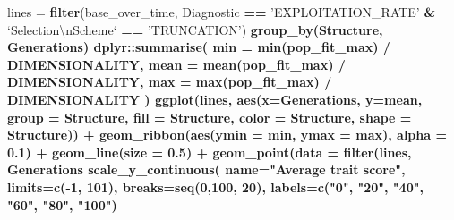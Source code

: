 \documentclass[]{book}
\newenvironment{Shaded}{\begin{snugshade}}{\end{snugshade}}
\newcommand{\CharTok}[1]{\textcolor[rgb]{0.31,0.60,0.02}{#1}}
\newcommand{\DataTypeTok}[1]{\textcolor[rgb]{0.13,0.29,0.53}{#1}}
\newcommand{\DecValTok}[1]{\textcolor[rgb]{0.00,0.00,0.81}{#1}}
\newcommand{\FloatTok}[1]{\textcolor[rgb]{0.00,0.00,0.81}{#1}}
\newcommand{\KeywordTok}[1]{\textcolor[rgb]{0.13,0.29,0.53}{\textbf{#1}}}
\newcommand{\NormalTok}[1]{#1}
\newcommand{\OperatorTok}[1]{\textcolor[rgb]{0.81,0.36,0.00}{\textbf{#1}}}
\newcommand{\StringTok}[1]{\textcolor[rgb]{0.31,0.60,0.02}{#1}}
\begin{document}
\begin{Shaded}
\begin{Highlighting}[]
\NormalTok{lines =}\StringTok{ }\KeywordTok{filter}\NormalTok{(base_over_time, Diagnostic }\OperatorTok{==}\StringTok{ 'EXPLOITATION_RATE'} \OperatorTok{&}\StringTok{ `}\DataTypeTok{Selection}\CharTok{\textbackslash{}n}\DataTypeTok{Scheme}\StringTok{`} \OperatorTok{==}\StringTok{ 'TRUNCATION'}\NormalTok{) }\OperatorTok{%>%}
\StringTok{  }\KeywordTok{group_by}\NormalTok{(Structure, Generations) }\OperatorTok{%>%}
\StringTok{  }\NormalTok{dplyr}\OperatorTok{::}\KeywordTok{summarise}\NormalTok{(}
    \DataTypeTok{min =} \KeywordTok{min}\NormalTok{(pop_fit_max) }\OperatorTok{/}\StringTok{ }\NormalTok{DIMENSIONALITY,}
    \DataTypeTok{mean =} \KeywordTok{mean}\NormalTok{(pop_fit_max) }\OperatorTok{/}\StringTok{ }\NormalTok{DIMENSIONALITY,}
    \DataTypeTok{max =} \KeywordTok{max}\NormalTok{(pop_fit_max) }\OperatorTok{/}\StringTok{ }\NormalTok{DIMENSIONALITY}
\NormalTok{  )}
\KeywordTok{ggplot}\NormalTok{(lines, }\KeywordTok{aes}\NormalTok{(}\DataTypeTok{x=}\NormalTok{Generations, }\DataTypeTok{y=}\NormalTok{mean, }\DataTypeTok{group =}\NormalTok{ Structure, }\DataTypeTok{fill =}\NormalTok{ Structure, }\DataTypeTok{color =}\NormalTok{ Structure, }\DataTypeTok{shape =}\NormalTok{ Structure)) }\OperatorTok{+}
\StringTok{  }\KeywordTok{geom_ribbon}\NormalTok{(}\KeywordTok{aes}\NormalTok{(}\DataTypeTok{ymin =}\NormalTok{ min, }\DataTypeTok{ymax =}\NormalTok{ max), }\DataTypeTok{alpha =} \FloatTok{0.1}\NormalTok{) }\OperatorTok{+}
\StringTok{  }\KeywordTok{geom_line}\NormalTok{(}\DataTypeTok{size =} \FloatTok{0.5}\NormalTok{) }\OperatorTok{+}
\StringTok{  }\KeywordTok{geom_point}\NormalTok{(}\DataTypeTok{data =} \KeywordTok{filter}\NormalTok{(lines, Generations }\OperatorTok{%%}\StringTok{ }\DecValTok{2000} \OperatorTok{==}\StringTok{ }\DecValTok{0}\NormalTok{), }\DataTypeTok{size =} \FloatTok{2.5}\NormalTok{, }\DataTypeTok{stroke =} \FloatTok{2.0}\NormalTok{, }\DataTypeTok{alpha =} \FloatTok{1.0}\NormalTok{) }\OperatorTok{+}
\StringTok{  }\KeywordTok{scale_y_continuous}\NormalTok{(}
    \DataTypeTok{name=}\StringTok{"Average trait score"}\NormalTok{,}
    \DataTypeTok{limits=}\KeywordTok{c}\NormalTok{(}\OperatorTok{-}\DecValTok{1}\NormalTok{, }\DecValTok{101}\NormalTok{),}
    \DataTypeTok{breaks=}\KeywordTok{seq}\NormalTok{(}\DecValTok{0}\NormalTok{,}\DecValTok{100}\NormalTok{, }\DecValTok{20}\NormalTok{),}
    \DataTypeTok{labels=}\KeywordTok{c}\NormalTok{(}\StringTok{"0"}\NormalTok{, }\StringTok{"20"}\NormalTok{, }\StringTok{"40"}\NormalTok{, }\StringTok{"60"}\NormalTok{, }\StringTok{"80"}\NormalTok{, }\StringTok{"100"}\NormalTok{)}
}}}
\end{Highlighting}
\end{Shaded}
\end{document}
